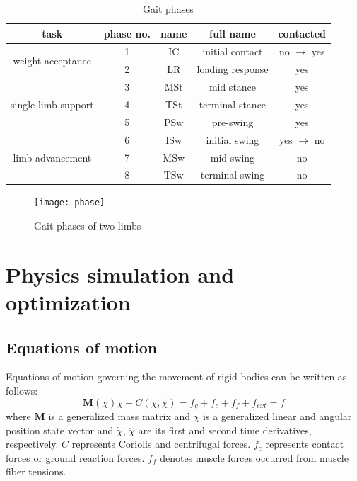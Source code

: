 \documentclass[master,english,final]{kaist-ucs}
\begin{document}
\begin{table}[h!]
\centering
  \begin{tabular}{ccccc}
          task                         &phase no. & name   &  full name        & contacted             \\
  \hline
  \multirow{2}{*}{weight acceptance}   & 1        &  IC    & initial contact   & no $\rightarrow$ yes  \\
                                       & 2        &  LR    & loading response  &      yes              \\
  \hline
  \multirow{3}{*}{single limb support} & 3        &  MSt   & mid stance        &      yes              \\
                                       & 4        &  TSt   & terminal stance   &      yes              \\
                                       & 5        &  PSw   & pre-swing         &      yes              \\
  \hline
  \multirow{3}{*}{limb advancement   } & 6        &  ISw   & initial swing     & yes  $\rightarrow$ no \\
                                       & 7        &  MSw   & mid swing         &       no              \\
                                       & 8        &  TSw   & terminal swing    &       no              \\
  \hline
\end{tabular}
\caption{Gait phases}
\label{gp}
\end{table}

\begin{figure}[h!]
  \centering
  \texttt{[image: phase]}
  \caption{Gait phases of two limbs}
  \label{fig:softjoint}
\end{figure}

\chapter{Physics simulation and optimization}

\section{Equations of motion}

Equations of motion governing the movement of rigid bodies can be written as follows:
\begin{equation}\label{MoEq2}
\mathbf{M}(\chi)\ddot\chi + C(\chi,\dot\chi )
 = f_g + f_c + f_f  + f_{ext} = f
\end{equation}
where $\mathbf{M}$ is a generalized mass matrix and $\chi$ is a generalized
linear and angular position
state vector and $\dot\chi$, $\ddot\chi$ are its first and second time derivatives,
respectively. $C$ represents Coriolis and centrifugal forces.
$f_c$ represents contact forces or ground reaction forces.
$f_f$ denotes muscle forces occurred from muscle fiber tensions.
\end{document}
